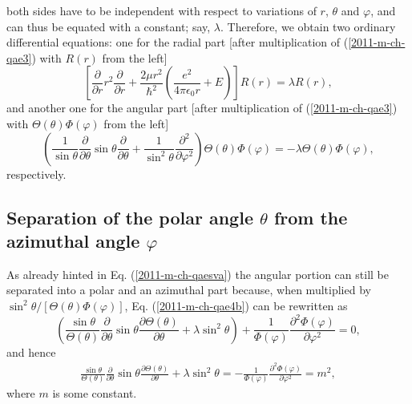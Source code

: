 both sides have to be independent with respect to variations of $r$, $\theta $ and $\varphi$, and
can thus be equated with a constant;
say, $\lambda$.
Therefore, we obtain two ordinary
differential equations: one for the radial part [after multiplication of (\ref{2011-m-ch-qae3}) with $R(r)$ from the left]
\begin{equation}
\left[  \frac{\partial}{\partial r} r^2\frac{\partial}{\partial r}  +
\frac{2\mu r^2}{\hslash^2} \left(\frac{e^2}{4\pi \epsilon_0 r} + E \right) \right] R(r)
 =  \lambda  R( r )  ,
\label{2011-m-ch-qae4a}
\end{equation}
and another one for the angular part [after multiplication of (\ref{2011-m-ch-qae3}) with $\Theta(\theta)\Phi(\varphi)$ from the left]
\begin{equation}
\left(
\frac{1}{\sin \theta}   \frac{\partial}{\partial \theta }
\sin \theta \frac{\partial}{\partial \theta }
+
\frac{1}{\sin^2 \theta} \frac{\partial^2}{\partial \varphi^2 }
\right)
\Theta(\theta)\Phi(\varphi)   =  -  \lambda  \Theta(\theta)\Phi(\varphi),
\label{2011-m-ch-qae4b}
\end{equation}
respectively.


\subsection{Separation of the polar angle $\theta$ from the azimuthal angle $\varphi $}

As already hinted in Eq. (\ref{2011-m-ch-qaesva})
the angular portion can still be separated into a polar and an azimuthal
part
because, when multiplied by $\sin^2 \theta /[\Theta(\theta)\Phi(\varphi)]$,
Eq.   (\ref{2011-m-ch-qae4b})
can be rewritten as
\begin{equation}
\left(
\frac{\sin \theta}{\Theta(\theta)}
\frac{\partial}{\partial \theta }
\sin \theta \frac{\partial \Theta(\theta)}{\partial \theta }
+  \lambda  \sin^2 \theta   \right)
+
\frac{1}{\Phi(\varphi)} \frac{\partial^2\Phi(\varphi)}{\partial \varphi^2 }
= 0,
\label{2011-m-ch-qae4bc}
\end{equation}
and hence
\begin{equation}
\begin{split}
\frac{\sin \theta}{\Theta(\theta)}
\frac{\partial}{\partial \theta }
\sin \theta \frac{\partial \Theta(\theta)}{\partial \theta }
+  \lambda  \sin^2 \theta
  = -
\frac{1}{\Phi(\varphi)} \frac{\partial^2\Phi(\varphi)}{\partial \varphi^2 }
=  m^2,
\end{split}
\label{2011-m-ch-qae8}
\end{equation}
where $m$ is some constant.

